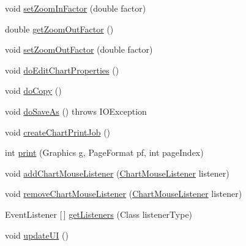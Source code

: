 \begin{DoxyCompactItemize}
\item 
void \mbox{\hyperlink{classorg_1_1jfree_1_1chart_1_1_chart_panel_a625413df0991bdbdbe999f73f30f2fd3}{set\+Zoom\+In\+Factor}} (double factor)
\item 
double \mbox{\hyperlink{classorg_1_1jfree_1_1chart_1_1_chart_panel_a5cd5ea564c46614edff846c7c0afbb9d}{get\+Zoom\+Out\+Factor}} ()
\item 
void \mbox{\hyperlink{classorg_1_1jfree_1_1chart_1_1_chart_panel_a138eceeb021b5e8c28c829bb5c3cb0e4}{set\+Zoom\+Out\+Factor}} (double factor)
\item 
void \mbox{\hyperlink{classorg_1_1jfree_1_1chart_1_1_chart_panel_a437151c21cb6a34197abba1597d7d9d8}{do\+Edit\+Chart\+Properties}} ()
\item 
void \mbox{\hyperlink{classorg_1_1jfree_1_1chart_1_1_chart_panel_a83056c7e30f254d07d5d7e206daa33f8}{do\+Copy}} ()
\item 
void \mbox{\hyperlink{classorg_1_1jfree_1_1chart_1_1_chart_panel_a4a61a0d6577302f81419285f7216cf97}{do\+Save\+As}} ()  throws I\+O\+Exception 
\item 
void \mbox{\hyperlink{classorg_1_1jfree_1_1chart_1_1_chart_panel_a054bf4da46d0694089b820c8032d3812}{create\+Chart\+Print\+Job}} ()
\item 
int \mbox{\hyperlink{classorg_1_1jfree_1_1chart_1_1_chart_panel_a5d268d825853e74d978f93bd962c87a9}{print}} (Graphics g, Page\+Format pf, int page\+Index)
\item 
void \mbox{\hyperlink{classorg_1_1jfree_1_1chart_1_1_chart_panel_ac52adbd22476ece66a369804778b0a3d}{add\+Chart\+Mouse\+Listener}} (\mbox{\hyperlink{interfaceorg_1_1jfree_1_1chart_1_1_chart_mouse_listener}{Chart\+Mouse\+Listener}} listener)
\item 
void \mbox{\hyperlink{classorg_1_1jfree_1_1chart_1_1_chart_panel_a29b3ca25117974b7ba91e8e2e85672c3}{remove\+Chart\+Mouse\+Listener}} (\mbox{\hyperlink{interfaceorg_1_1jfree_1_1chart_1_1_chart_mouse_listener}{Chart\+Mouse\+Listener}} listener)
\item 
Event\+Listener \mbox{[}$\,$\mbox{]} \mbox{\hyperlink{classorg_1_1jfree_1_1chart_1_1_chart_panel_a0b6c9045c7fd6291221d290f84c68668}{get\+Listeners}} (Class listener\+Type)
\item 
void \mbox{\hyperlink{classorg_1_1jfree_1_1chart_1_1_chart_panel_a26607f6991e37c7115a3bf04ebd34b8e}{update\+UI}} ()
\end{DoxyCompactItemize}
